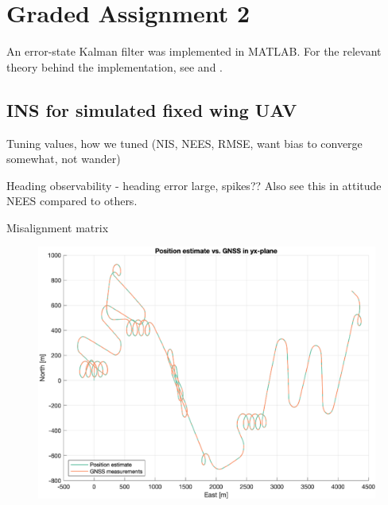 \section{Graded Assignment 2}\label{sec:graded_assignment_2}


An error-state Kalman filter was implemented in MATLAB. For the relevant theory behind the implementation, see \cite{Sola} and \cite{Edmund}.

\subsection{INS for simulated fixed wing UAV}

Tuning values, how we tuned (NIS, NEES, RMSE, want bias to converge somewhat, not wander)

Heading observability - heading error large, spikes?? Also see this in attitude NEES compared to others.

Misalignment matrix

\begin{figure}[!htb]
    \centering
    \includegraphics[width=0.6\linewidth]{figures/ga_2/sim_trajectory.eps}
    \caption{}
    \label{fig:ga_2_sim_trajectory}
\end{figure}


